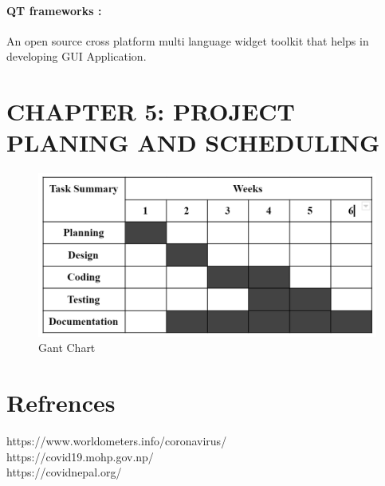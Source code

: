 \documentclass{article}
\begin{document}
\paragraph{QT frameworks :} An open source cross platform multi language widget toolkit that helps in developing GUI Application.

\clearpage

\section{CHAPTER 5: PROJECT PLANING AND SCHEDULING}
\begin{figure}[h]
    \centerline{\includegraphics[width = 190mm]{chart.png}}
    \caption{Gant Chart}
    \label{fig}
\end{figure}

\begin{figure}[h]
\end{figure}

\clearpage

\section{Refrences}
https://www.worldometers.info/coronavirus/
\\
https://covid19.mohp.gov.np/
\\
https://covidnepal.org/
\end{document}
